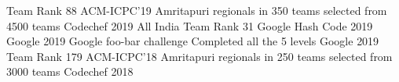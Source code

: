 
\begin{cvhonors}
  \cvhonor
   {Team Rank 88}
    {ACM-ICPC'19 Amritapuri regionals in 350 teams selected from 4500 teams}
    {Codechef}
    {2019}
    \cvhonor
   {All India Team Rank 31}
    {Google Hash Code 2019}
    {Google}
    {2019}
    \cvhonor
   {Google foo-bar challenge}
    {Completed all the 5 levels}
    {Google}
    {2019}
   \cvhonor
    {Team Rank 179}
    {ACM-ICPC'18 Amritapuri regionals in 250 teams selected from 3000 teams}
    {Codechef}
    {2018}
\end{cvhonors}


